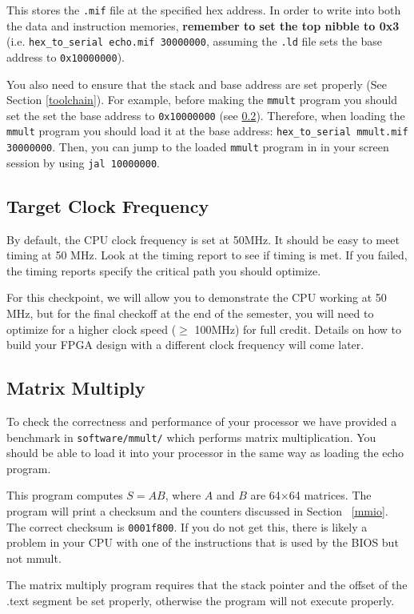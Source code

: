 \documentclass[11pt]{article}
\begin{document}
This stores the \verb|.mif| file at the specified hex address.
In order to write into both the data and instruction memories, \textbf{remember to set the top nibble to 0x3} (i.e. \verb|hex_to_serial echo.mif 30000000|, assuming the \verb|.ld| file sets the base address to \verb|0x10000000|).

You also need to ensure that the stack and base address are set properly (See Section \ref{toolchain}).
For example, before making the \verb|mmult| program you should set the set the base address to \verb|0x10000000| (see \ref{mmult}).
Therefore, when loading the \verb|mmult| program you should load it at the base address: \verb|hex_to_serial mmult.mif 30000000|.
Then, you can jump to the loaded \verb|mmult| program in in your screen session by using \verb|jal 10000000|.

\subsection{Target Clock Frequency}
By default, the CPU clock frequency is set at 50MHz.
It should be easy to meet timing at 50 MHz.
Look at the timing report to see if timing is met.
If you failed, the timing reports specify the critical path you should optimize.

For this checkpoint, we will allow you to demonstrate the CPU working at 50 MHz, but for the final checkoff at the end of the semester, you will need to optimize for a higher clock speed ($\geq$ 100MHz) for full credit.
Details on how to build your FPGA design with a different clock frequency will come later.

\subsection{Matrix Multiply}
\label{mmult}
To check the correctness and performance of your processor we have provided a benchmark in \verb|software/mmult/| which performs matrix multiplication.
You should be able to load it into your processor in the same way as loading the echo program.

This program computes $S=AB$, where $A$ and $B$ are 64$\times$64 matrices.
The program will print a checksum and the counters discussed in Section ~\ref{mmio}.
The correct checksum is \verb|0001f800|.
If you do not get this, there is likely a problem in your CPU with one of the instructions that is used by the BIOS but not mmult.

The matrix multiply program requires that the stack pointer and the offset of the .text segment be set properly, otherwise the program will not execute properly.
\end{document}
